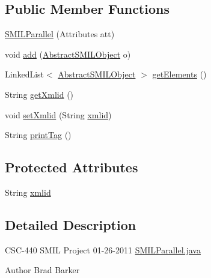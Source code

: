 \subsection*{Public Member Functions}
\begin{DoxyCompactItemize}
\item 
\hyperlink{classcsc440_1_1nuf_1_1components_1_1_s_m_i_l_parallel_a10d6d99522be99cae5b4dc5e357546fa}{S\-M\-I\-L\-Parallel} (Attributes att)
\item 
void \hyperlink{classcsc440_1_1nuf_1_1components_1_1_s_m_i_l_parallel_af9a43098b50d757cea757ac4216b0b07}{add} (\hyperlink{classcsc440_1_1nuf_1_1components_1_1_abstract_s_m_i_l_object}{Abstract\-S\-M\-I\-L\-Object} o)
\item 
Linked\-List$<$ \hyperlink{classcsc440_1_1nuf_1_1components_1_1_abstract_s_m_i_l_object}{Abstract\-S\-M\-I\-L\-Object} $>$ \hyperlink{classcsc440_1_1nuf_1_1components_1_1_s_m_i_l_parallel_a63d48a732e446ed8d7fea49fce46f01a}{get\-Elements} ()
\item 
String \hyperlink{classcsc440_1_1nuf_1_1components_1_1_s_m_i_l_parallel_a955354ced713f72891a44b76ab4c5736}{get\-Xmlid} ()
\item 
void \hyperlink{classcsc440_1_1nuf_1_1components_1_1_s_m_i_l_parallel_aa7cca2f16e2f1be55f72ca9554235ecd}{set\-Xmlid} (String \hyperlink{classcsc440_1_1nuf_1_1components_1_1_s_m_i_l_parallel_a1b91be8e079621e4d1f316c80c3ef73d}{xmlid})
\item 
String \hyperlink{classcsc440_1_1nuf_1_1components_1_1_s_m_i_l_parallel_a4ad0639616ec446c16c3f8fae4932d9f}{print\-Tag} ()
\end{DoxyCompactItemize}
\subsection*{Protected Attributes}
\begin{DoxyCompactItemize}
\item 
String \hyperlink{classcsc440_1_1nuf_1_1components_1_1_s_m_i_l_parallel_a1b91be8e079621e4d1f316c80c3ef73d}{xmlid}
\end{DoxyCompactItemize}


\subsection{Detailed Description}
C\-S\-C-\/440 S\-M\-I\-L Project 01-\/26-\/2011 \hyperlink{_s_m_i_l_parallel_8java}{S\-M\-I\-L\-Parallel.\-java} \begin{DoxyAuthor}{Author}
Brad Barker 
\end{DoxyAuthor}


